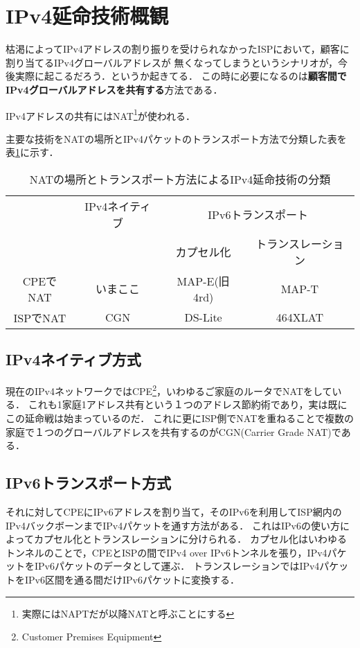 \section{IPv4延命技術概観}

\lettrine{枯}
渇によってIPv4アドレスの割り振りを受けられなかったISPにおいて，顧客に割り当てるIPv4グローバルアドレスが
無くなってしまうというシナリオが，今後実際に起こるだろう．というか起きてる．
この時に必要になるのは\textbf{顧客間でIPv4グローバルアドレスを共有する}方法である．

IPv4アドレスの共有にはNAT\footnote{実際にはNAPTだが以降NATと呼ぶことにする}が使われる．

主要な技術をNATの場所とIPv4パケットのトランスポート方法で分類した表を表\ref{yuyarin-nat-transport}に示す．

\begin{table}[htbp]
\begin{center}
\begin{tabular}{cccc} \hline
 & IPv4ネイティブ & \multicolumn{2}{c}{IPv6トランスポート} \\
 & & カプセル化 & トランスレーション \\\hline
CPEでNAT & いまここ & MAP-E(旧4rd) & MAP-T \\
ISPでNAT & CGN & DS-Lite & 464XLAT \\\hline
\end{tabular}
\end{center}
\caption{NATの場所とトランスポート方法によるIPv4延命技術の分類}
\label{yuyarin-nat-transport}
\end{table}


\subsection{IPv4ネイティブ方式}

現在のIPv4ネットワークではCPE\footnote{Customer Premises Equipment}，いわゆるご家庭のルータでNATをしている．
これも1家庭1アドレス共有という１つのアドレス節約術であり，実は既にこの延命戦は始まっているのだ．
これに更にISP側でNATを重ねることで複数の家庭で１つのグローバルアドレスを共有するのがCGN(Carrier Grade NAT)である．

\subsection{IPv6トランスポート方式}
それに対してCPEにIPv6アドレスを割り当て，そのIPv6を利用してISP網内のIPv4バックボーンまでIPv4パケットを通す方法がある．
これはIPv6の使い方によってカプセル化とトランスレーションに分けられる．
カプセル化はいわゆるトンネルのことで，CPEとISPの間でIPv4 over IPv6トンネルを張り，IPv4パケットをIPv6パケットのデータとして運ぶ．
トランスレーションではIPv4パケットをIPv6区間を通る間だけIPv6パケットに変換する．

